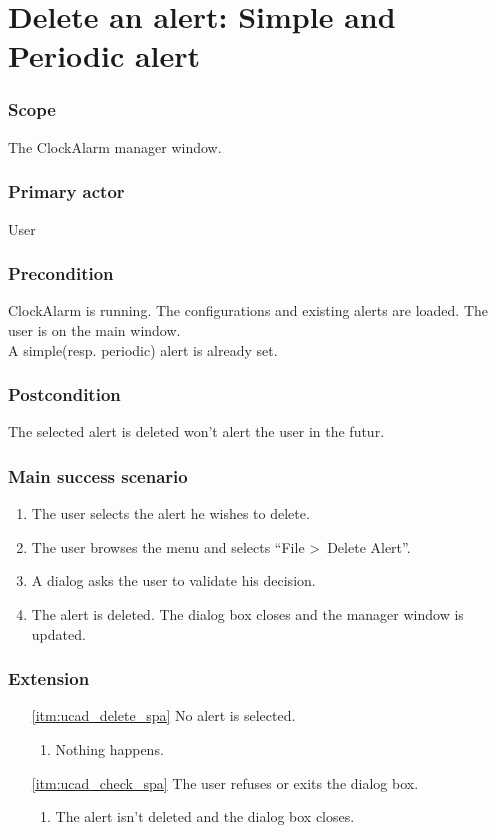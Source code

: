 \section{Delete an alert: Simple and Periodic alert}\label{subsec:usecase_delete_simple_alert}

\subsubsection{Scope}
The ClockAlarm manager window.
\subsubsection{Primary actor}
User
\subsubsection{Precondition}
ClockAlarm is running. The configurations and existing alerts are loaded. The user is on the main window.
\\A simple(resp. periodic) alert is already set.
\subsubsection{Postcondition}
The selected alert is deleted won't alert the user in the futur.
\subsubsection{Main success scenario}
\begin{enumerate}
	\item The user selects the alert he wishes to delete.
	\item \label{itm:ucad_delete_spa} The user browses the menu and selects ``File \textgreater~Delete Alert''.
	\item \label{itm:ucad_check_spa} A dialog asks the user to validate his decision.
	\item The alert is deleted. The dialog box closes and the manager window is updated.
\end{enumerate}
\subsubsection{Extension}
\begin{enumerate}
	\item[\ref{itm:ucad_delete_spa}] No alert is selected.
	\begin{enumerate}[i]
		\item Nothing happens.
	\end{enumerate}
	
	\item[\ref{itm:ucad_check_spa}] The user refuses or exits the dialog box.
	\begin{enumerate}[i]
		\item The alert isn't deleted and the dialog box closes.
	\end{enumerate}
\end{enumerate}

